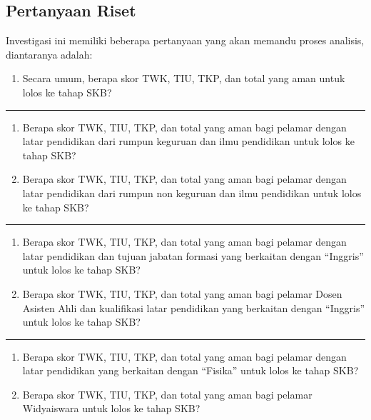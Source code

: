 \documentclass[
]{article}
\providecommand{\tightlist}{%
  \setlength{\itemsep}{0pt}\setlength{\parskip}{0pt}}
\begin{document}
\subsection{Pertanyaan Riset}\label{pertanyaan-riset}

Investigasi ini memiliki beberapa pertanyaan yang akan memandu proses
analisis, diantaranya adalah:

\begin{enumerate}
\def\labelenumi{\arabic{enumi}.}
\tightlist
\item
  Secara umum, berapa skor TWK, TIU, TKP, dan total yang aman untuk
  lolos ke tahap SKB?
\end{enumerate}

\begin{center}\rule{0.5\linewidth}{0.5pt}\end{center}

\begin{enumerate}
\def\labelenumi{\arabic{enumi}.}
\setcounter{enumi}{1}
\tightlist
\item
  Berapa skor TWK, TIU, TKP, dan total yang aman bagi pelamar dengan
  latar pendidikan dari rumpun keguruan dan ilmu pendidikan untuk lolos
  ke tahap SKB?
\item
  Berapa skor TWK, TIU, TKP, dan total yang aman bagi pelamar dengan
  latar pendidikan dari rumpun non keguruan dan ilmu pendidikan untuk
  lolos ke tahap SKB?
\end{enumerate}

\begin{center}\rule{0.5\linewidth}{0.5pt}\end{center}

\begin{enumerate}
\def\labelenumi{\arabic{enumi}.}
\setcounter{enumi}{3}
\tightlist
\item
  Berapa skor TWK, TIU, TKP, dan total yang aman bagi pelamar dengan
  latar pendidikan dan tujuan jabatan formasi yang berkaitan dengan
  ``Inggris'' untuk lolos ke tahap SKB?
\item
  Berapa skor TWK, TIU, TKP, dan total yang aman bagi pelamar Dosen
  Asisten Ahli dan kualifikasi latar pendidikan yang berkaitan dengan
  ``Inggris'' untuk lolos ke tahap SKB?
\end{enumerate}

\begin{center}\rule{0.5\linewidth}{0.5pt}\end{center}

\begin{enumerate}
\def\labelenumi{\arabic{enumi}.}
\setcounter{enumi}{5}
\tightlist
\item
  Berapa skor TWK, TIU, TKP, dan total yang aman bagi pelamar dengan
  latar pendidikan yang berkaitan dengan ``Fisika'' untuk lolos ke tahap
  SKB?
\item
  Berapa skor TWK, TIU, TKP, dan total yang aman bagi pelamar
  Widyaiswara untuk lolos ke tahap SKB?
\end{enumerate}
\end{document}
